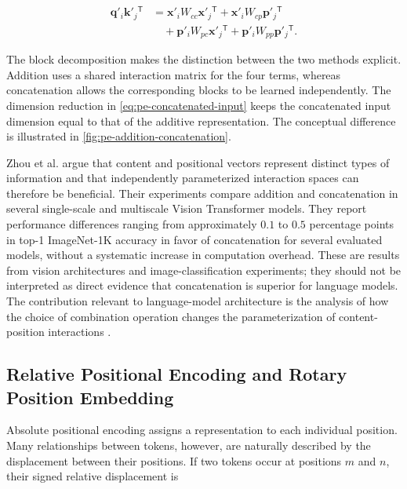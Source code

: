 \begin{align}
    \mathbf{q}'_i\mathbf{k}'_j{}^{\mathsf T}
    &=
    \mathbf{x}'_iW_{cc}\mathbf{x}'_j{}^{\mathsf T}
    +\mathbf{x}'_iW_{cp}\mathbf{p}'_j{}^{\mathsf T}
    \nonumber\\
    &\quad+
    \mathbf{p}'_iW_{pc}\mathbf{x}'_j{}^{\mathsf T}
    +\mathbf{p}'_iW_{pp}\mathbf{p}'_j{}^{\mathsf T}.
    \label{eq:pe-concat-four-terms}
\end{align}

The block decomposition makes the distinction between the two methods
explicit. Addition uses a shared interaction matrix for the four terms,
whereas concatenation allows the corresponding blocks to be learned
independently. The dimension reduction in \cref{eq:pe-concatenated-input}
keeps the concatenated input dimension equal to that of the additive
representation. The conceptual difference is illustrated in
\cref{fig:pe-addition-concatenation}.

Zhou et al. argue that content and positional vectors represent distinct
types of information and that independently parameterized interaction
spaces can therefore be beneficial. Their experiments compare addition and
concatenation in several single-scale and multiscale Vision Transformer
models. They report performance differences ranging from approximately
\(0.1\) to \(0.5\) percentage points in top-1 ImageNet-1K accuracy in
favor of concatenation for several evaluated models, without a systematic
increase in computation overhead. These are results from vision
architectures and image-classification experiments; they should not be
interpreted as direct evidence that concatenation is superior for language
models. The contribution relevant to language-model architecture is the
analysis of how the choice of combination operation changes the
parameterization of content-position interactions \parencite{zhou2024rethinking}.

\subsection{Relative Positional Encoding and Rotary Position Embedding}
\label{subsec:pe-relative-rope}

Absolute positional encoding assigns a representation to each individual
position. Many relationships between tokens, however, are naturally
described by the displacement between their positions. If two tokens occur
at positions \(m\) and \(n\), their signed relative displacement is

